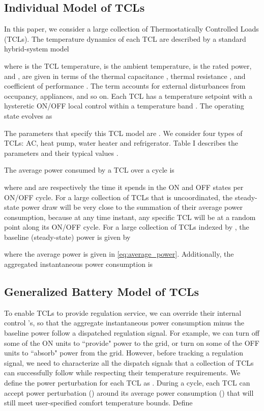 \documentclass[onecolumn,journal]{IEEEtran}
\begin{document}
\subsection{Individual Model of \acp{TCL}}
\label{sec:model}
In this paper, we consider a large collection of Thermostatically Controlled Loads (TCLs). The temperature dynamics of each \ac{TCL} are described by a standard hybrid-system model

where  is the \ac{TCL} temperature,  is the ambient temperature,  is the rated power, and  ,  are given in terms of the thermal capacitance , thermal resistance , and coefficient of performance . The term  accounts for external disturbances from occupancy, appliances, and so on.  Each \ac{TCL} has a temperature setpoint  with a hysteretic ON/OFF local control within a temperature band .  The operating state  evolves as

The parameters that specify this \ac{TCL} model are . We consider four types of \acp{TCL}: AC, heat pump, water heater and refrigerator. Table I describes the parameters and their typical values \cite{mathieu_revenue}. 

The average power consumed by a \ac{TCL} over a cycle is 

where  and   are respectively the time it spends in the ON and OFF states per ON/OFF cycle. For a large collection of \acp{TCL} that is uncoordinated, the steady-state power draw will be very close to the summation of their average power consumption, because at any time instant, any specific \ac{TCL} will be at a random point along its ON/OFF cycle. For a large collection of  \acp{TCL} indexed by , the baseline (steady-state) power is given by

where the average power  is given in \eqref{eq:average_power}. 
Additionally, the aggregated instantaneous power consumption is 



\subsection{Generalized Battery Model of \acp{TCL}}\label{sec:battery}
To enable TCLs to provide regulation service, we can override their internal control 's, so that the aggregate instantaneous power consumption  minus the baseline power  follow a dispatched regulation signal. For example, we can turn off some of the ON units to ``provide" power to the grid, or  turn on some of the OFF units to ``absorb" power from the grid. However, before tracking a regulation signal, we need to characterize all the dispatch signals that a collection of TCLs can successfully follow while respecting their temperature requirements. We define the power perturbation for each TCL as . During a cycle, each \ac{TCL} can accept power perturbation () around its average power consumption () that will still meet user-specified comfort temperature bounds.
Define 
\end{document}
